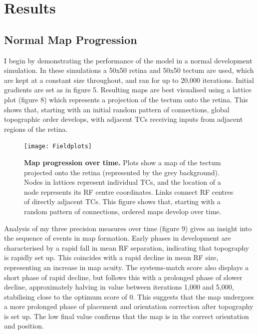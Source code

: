 \documentclass[11pt]{"article"}
\begin{document}
\section{Results}

\subsection{Normal Map Progression}

I begin by demonstrating the performance of the model in a normal development simulation. In these simulations a 50x50 retina and 50x50 tectum are used, which are kept at a constant size throughout, and ran for up to 20,000 iterations. Initial gradients are set as in figure 5. Resulting maps are best visualised using a lattice plot (figure 8) which represents a projection of the tectum onto the retina. This shows that, starting with an initial random pattern of connections, global topographic order develops, with adjacent TCs receiving inputs from adjacent regions of the retina.\\


\begin{figure}[!h]
\texttt{[image: Fieldplots]}
\caption{\textbf{Map progression over time.} 
Plots show a map of the tectum projected onto the retina (represented by the grey background). Nodes in lattices represent individual TCs, and the location of a node represents its RF centre coordinates. Links connect RF centres of directly adjacent TCs. This figure shows that, starting with a random pattern of connections, ordered maps develop over time.}
\end{figure}

\pagebreak

Analysis of my three precision measures over time (figure 9) gives an insight into the sequence of events in map formation. Early phases in development are characterised by a rapid fall in mean RF separation, indicating that topography is rapidly set up. This coincides with a rapid decline in mean RF size, representing an increase in map acuity. The systems-match score also displays a short phase of rapid decline, but follows this with a prolonged phase of slower decline, approximately halving in value between iterations 1,000 and 5,000, stabilising close to the optimum score of 0. This suggests that the map undergoes a more prolonged phase of placement and orientation correction after topography is set up. The low final value confirms that the map is in the correct orientation and position.\\
\end{document}
